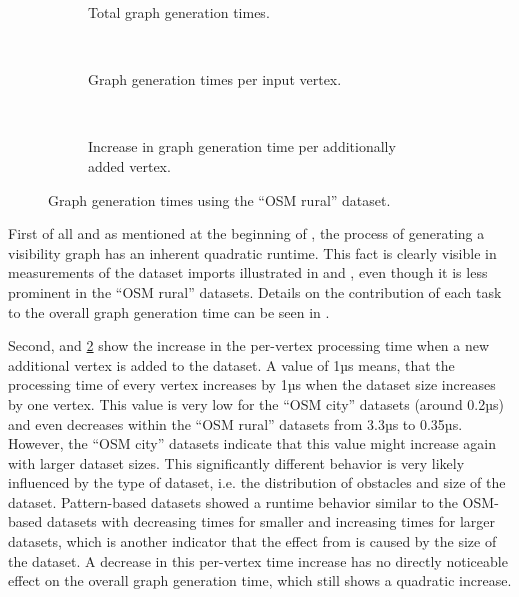 \begin{figure}[h!]
\begin{minipage}{.48\textwidth}
\begin{subfigure}[t]{\linewidth}
						\caption{Total graph generation times.}
						\label{fig:eval-import-rural-abs}
					\end{subfigure}
					\\[3ex]
					\begin{subfigure}[t]{\linewidth}
						\begin{figcenter}
							
						\end{figcenter}
						\caption{Graph generation times per input vertex.}
					\end{subfigure}
					\\[3ex]
					\begin{subfigure}[t]{\linewidth}
						\begin{figcenter}
							
						\end{figcenter}
						\caption{Increase in graph generation time per additionally added vertex.}
						\label{fig:eval-import-rural-rel-increase}
					\end{subfigure}
					\caption{Graph generation times using the \enquote{OSM rural} dataset.}
					\label{fig:eval-import-rural}
				\end{minipage}
			\end{figure}
			
			First of all and as mentioned at the beginning of , the process of generating a visibility graph has an inherent quadratic runtime.
			This fact is clearly visible in measurements of the dataset imports illustrated in  and , even though it is less prominent in the \enquote{OSM rural} datasets.
			Details on the contribution of each task to the overall graph generation time can be seen in .
			
			Second,  and \ref{fig:eval-import-rural-rel-increase} show the increase in the per-vertex processing time when a new additional vertex is added to the dataset.
			A value of 1µs means, that the processing time of every vertex increases by 1µs when the dataset size increases by one vertex.
			This value is very low for the \enquote{OSM city} datasets (around 0.2µs) and even decreases within the \enquote{OSM rural} datasets from 3.3µs to 0.35µs.
			However, the \enquote{OSM city} datasets indicate that this value might increase again with larger dataset sizes.
			This significantly different behavior is very likely influenced by the type of dataset, i.e. the distribution of obstacles and size of the dataset.
			Pattern-based datasets showed a runtime behavior similar to the OSM-based datasets with decreasing times for smaller and increasing times for larger datasets, which is another indicator that the effect from  is caused by the size of the dataset.
			A decrease in this per-vertex time increase has no directly noticeable effect on the overall graph generation time, which still shows a quadratic increase.
			
